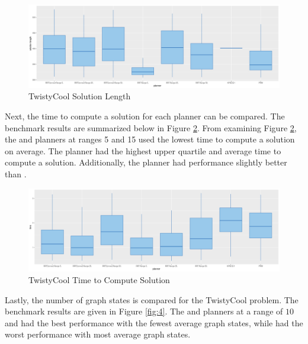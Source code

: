 \documentclass[11pt]{article}
\newcommand{\forceindent}{\leavevmode{\parindent=1em\indent}}
\begin{document}
\begin{enumerate}[leftmargin=0.3in]
\begin{enumerate}[leftmargin=0.3in]
  \begin{figure}[H]
        \centering
        \includegraphics[width=12cm]{figures/twistycool_solnlength-1.png}
        \caption{TwistyCool Solution Length}
        \label{fig:2}
    \end{figure}

\forceindent Next, the time to compute a solution for each planner can be compared. The benchmark results are summarized below in Figure \ref{fig:3}. From examining Figure \ref{fig:3}, the  and  planners at ranges 5 and 15 used the lowest time to compute a solution on average. The  planner had the highest upper quartile and average time to compute a solution. Additionally, the  planner had performance slightly better than . 
    
    \begin{figure}[H]
        \centering
        \includegraphics[width=12cm]{figures/twistycool_time-1.png}
        \caption{TwistyCool Time to Compute Solution}
        \label{fig:3}
    \end{figure}

\forceindent Lastly, the number of graph states is compared for the TwistyCool problem. The benchmark results are given in Figure \ref{fig:4}. The  and  planners at a range of $10$ and  had the best performance with the fewest average graph states, while  had the worst performance with most average graph states.     
    

\end{enumerate}
\end{enumerate}
\end{document}
